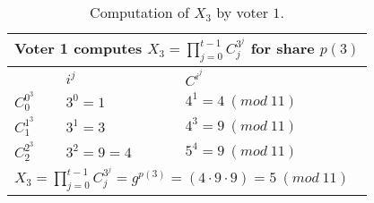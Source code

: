\begin{table}[H]
\centering
\begin{tabular}{|l|l|l|}
\hline
\multicolumn{3}{|l|}{\textbf{Voter 1 computes $X_3 =\prod\limits_{j=0}^{t-1} C_j^{3^j}$  for share $p(3)$ }}          \\ \hline
                                                         & $i^j$              & $C^{i^{j}}$          \\ \hline
$C^{0^{3}}_0$           & $3^{0} = 1$          & $4^{1} = 4 \ (mod \ 11)$                   \\ \hline
$C^{1^{3}}_1$           & $3^{1} = 3$          & $4^{3} = 9 \ (mod \ 11)$                   \\ \hline
$C^{2^{3}}_2$           & $3^{2} = 9 = 4$          & $5^{4} = 9 \ (mod \ 11)$                   \\ \hline
\multicolumn{3}{|l|}{$X_3 =\prod\limits_{j=0}^{t-1} C_j^{3^j} = g^{p(3)} = (4 \cdot 9 \cdot 9) = 5 \ (mod \ 11)$} \\ \hline
\end{tabular}
\caption{Computation of $X_3$ by voter $1$. }
\label{my-label}
\end{table}


